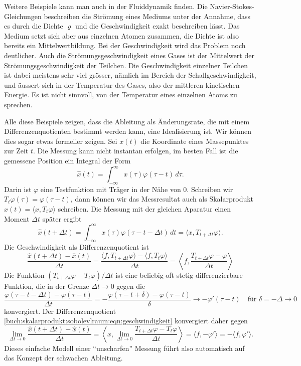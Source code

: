 Weitere Beispiele kann man auch in der Fluiddynamik finden.
Die Navier-Stokes-Gleichungen beschreiben die Strömung eines Mediums
unter der Annahme, dass es durch die Dichte $\varrho$ und die
Geschwindigkeit exakt beschreiben lässt.
Das Medium setzt sich aber aus einzelnen Atomen zusammen, die Dichte
ist also bereits ein Mittelwertbildung.
Bei der Geschwindigkeit wird das Problem noch deutlicher.
Auch die Strömungsgeschwindigkeit eines Gases ist der Mittelwert der
Strömungsgeschwindigkeit der Teilchen. 
Die Geschwindigkeit einzelner Teilchen ist dabei meistens sehr viel
grösser, nämlich im Bereich der Schallgeschwindigkeit, und äussert sich
in der Temperatur des Gases, also der mittleren kinetischen Energie.
Es ist nicht sinnvoll, von der Temperatur eines einzelnen Atoms zu
sprechen.

Alle diese Beispiele zeigen, dass die Ableitung als Änderungsrate, die
mit einem Differenzenquotienten bestimmt werden kann, eine Idealisierung
ist.
Wir können dies sogar etwas formeller zeigen.
Sei $x(t)$ die Koordinate eines Massepunktes zur Zeit $t$.
Die Messung kann nicht instantan erfolgen, im besten Fall ist die
gemessene Position ein Integral der Form
\[
\hat{x}(t)
=
\int_{-\infty}^\infty x(\tau) \varphi(\tau - t)\,d\tau.
\]
Darin ist $\varphi$ eine Testfunktion mit Träger in der Nähe von $0$.
Schreiben wir $T_t\varphi(\tau) = \varphi(\tau -t)$, dann können wir
das Messresultat auch als Skalarprodukt
$\hat{x}(t)=\langle x,T_t\varphi\rangle$
schreiben.
Die Messung mit der gleichen Aparatur einen Moment $\Delta t$ später ergibt
\[
\hat{x}(t+\Delta t)
=
\int_{-\infty}^\infty x(\tau) \varphi(\tau-t-\Delta t)\,dt
=
\langle x, T_{t+\Delta t}\varphi\rangle.
\]
Die Geschwindigkeit als Differenzenquotient ist
\begin{equation}
\frac{
\hat{x}(t+\Delta t)-\hat{x}(t)
}{\Delta t}
=
\frac{
\langle f,T_{t+\Delta t}\varphi\rangle
-
\langle f,T_{t}\varphi\rangle
}{
\Delta t
}
=
\left\langle
f,\frac{T_{t+\Delta t}\varphi - \varphi}{\Delta t}
\right\rangle
\label{buch:skalarprodukt:sobolevlraum:eqn:geschwindigkeit}
\end{equation}
Die Funktion $(T_{t+\Delta t}\varphi-T_t\varphi)/\Delta t$ ist eine 
beliebig oft stetig differenzierbare Funktion, die in der Grenze
$\Delta t\to 0$ gegen die
\[
\frac{
\varphi(\tau - t - \Delta t)
-
\varphi(\tau - t)
}{
\Delta t
}
=
-
\frac{
\varphi(\tau - t + \delta) - \varphi(\tau - t)
}{
\delta
}
\to 
-
\varphi'(\tau - t)
\quad
\text{für $\delta = - \Delta \to 0$}
\]
konvergiert.
Der Differenzenquotient
\eqref{buch:skalarprodukt:sobolevlraum:eqn:geschwindigkeit}
konvergiert daher gegen
\[
\lim_{\Delta t\to 0}
\frac{
\hat{x}(t+\Delta t)-\hat{x}(t)
}{\Delta t}
=
\left\langle
x,
\lim_{\Delta t\to 0}
\frac{T_{t+\Delta t}\varphi-T_t\varphi}{\Delta t}
\right\rangle
=
\langle f,-\varphi'\rangle
=
-
\langle f, \varphi'\rangle.
\]
Dieses einfache Modell einer ``unscharfen'' Messung führt also automatisch
auf das Konzept der schwachen Ableitung.






